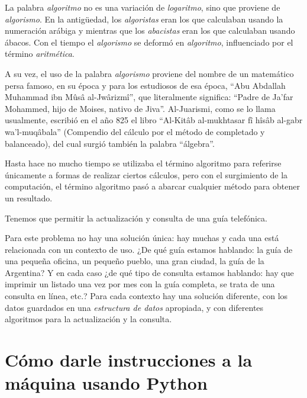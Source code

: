 \begin{sabias_que}
La palabra \textit{algoritmo} no es una variación de \textit{logaritmo},
sino que proviene de \textit{algorismo}. En la antigüedad, los
\textit{algoristas} eran los que calculaban usando la numeración arábiga y
mientras que los \textit{abacistas} eran los que calculaban usando ábacos.
Con el tiempo el \textit{algorismo} se deformó en \textit{algoritmo},
influenciado por el término \textit{aritmética}.

A su vez, el uso de la palabra \textit{algorismo} proviene del nombre de un
matemático persa famoso, en su época y para los estudiosos de esa época,
``Abu Abdallah Muhammad ibn Mûsâ al-Jwârizmî'', que literalmente significa:
``Padre de Ja'far Mohammed, hijo de Moises, nativo de Jiva''. Al-Juarismi,
como se lo llama usualmente, escribió en el año 825 el libro ``Al-Kitâb
al-mukhtasar fî hîsâb al-gabr wa'l-muqâbala'' (Compendio del cálculo por el
método de completado y balanceado), del cual surgió también la palabra
``álgebra''.

Hasta hace no mucho tiempo se utilizaba el término algoritmo para referirse
únicamente a formas de realizar ciertos cálculos, pero con el surgimiento
de la computación, el término algoritmo pasó a abarcar cualquier método
para obtener un resultado.
\end{sabias_que}

\begin{problemac}

Tenemos que permitir la actualización y consulta de una guía
telefónica.

\end{problemac}

Para este problema no hay una solución única: hay muchas y cada
una está relacionada con un contexto de uso. ¿De qué guía estamos
hablando: la guía de una pequeña oficina, un pequeño pueblo, una
gran ciudad, la guía de la Argentina? Y en cada caso ¿de qué tipo
de consulta estamos hablando: hay que imprimir un listado una vez
por mes con la guía completa, se trata de una consulta en línea,
etc.? Para cada contexto hay una solución diferente, con los datos
guardados en una {\it estructura de datos} apropiada, y con
diferentes algoritmos para la actualización y la consulta.

%
%

\section{Cómo darle instrucciones a la máquina usando Python}

